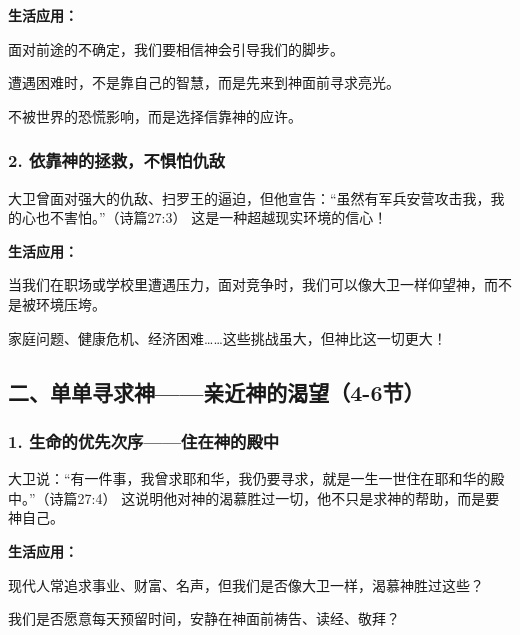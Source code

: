 \documentclass[a4paper, 12pt]{article}
\begin{document}
\vspace{0.2cm}

\textbf{生活应用：}

\hspace{0.6cm}面对前途的不确定，我们要相信神会引导我们的脚步。

\hspace{0.6cm}遭遇困难时，不是靠自己的智慧，而是先来到神面前寻求亮光。

\hspace{0.6cm}不被世界的恐慌影响，而是选择信靠神的应许。


\subsubsection*{2. 依靠神的拯救，不惧怕仇敌}
\hspace{0.6cm}大卫曾面对强大的仇敌、扫罗王的逼迫，但他宣告：“虽然有军兵安营攻击我，我的心也不害怕。”（诗篇27:3） 这是一种超越现实环境的信心！

\vspace{0.2cm}

\textbf{生活应用：}

\hspace{0.6cm}当我们在职场或学校里遭遇压力，面对竞争时，我们可以像大卫一样仰望神，而不是被环境压垮。

\hspace{0.6cm}家庭问题、健康危机、经济困难……这些挑战虽大，但神比这一切更大！


\subsection*{二、单单寻求神——亲近神的渴望（4-6节）}
\subsubsection*{1. 生命的优先次序——住在神的殿中}
\hspace{0.6cm}大卫说：“有一件事，我曾求耶和华，我仍要寻求，就是一生一世住在耶和华的殿中。”（诗篇27:4） 这说明他对神的渴慕胜过一切，他不只是求神的帮助，而是要神自己。

\vspace{0.2cm}

\textbf{生活应用：}

\hspace{0.6cm}现代人常追求事业、财富、名声，但我们是否像大卫一样，渴慕神胜过这些？

\hspace{0.6cm}我们是否愿意每天预留时间，安静在神面前祷告、读经、敬拜？
\end{document}
